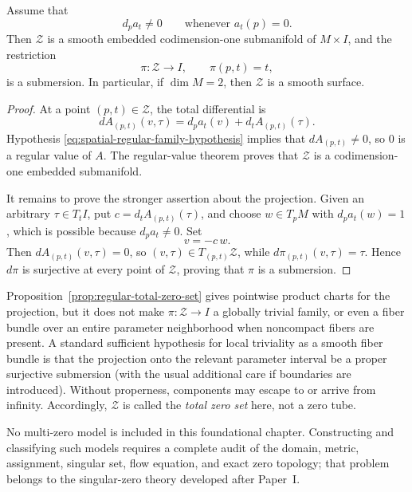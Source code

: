\begin{proposition}\label{prop:regular-total-zero-set}
Assume that
\begin{equation}\label{eq:spatial-regular-family-hypothesis}
 d_pa_t\ne0
 \qquad\text{whenever }a_t(p)=0.
\end{equation}
Then \(\mathcal Z\) is a smooth embedded codimension-one submanifold of
\(M\times I\), and the restriction
\begin{equation}\label{eq:zero-family-projection}
 \pi:\mathcal Z\longrightarrow I,
 \qquad
 \pi(p,t)=t,
\end{equation}
is a submersion.  In particular, if \(\dim M=2\), then
\(\mathcal Z\) is a smooth surface.
\end{proposition}

\begin{proof}
At a point \((p,t)\in\mathcal Z\), the total differential is
\[
 dA_{(p,t)}(v,\tau)
 =d_pa_t(v)+d_tA_{(p,t)}(\tau).
\]
Hypothesis \eqref{eq:spatial-regular-family-hypothesis} implies that
\(dA_{(p,t)}\ne0\), so \(0\) is a regular value of \(A\).  The regular-value
theorem proves that \(\mathcal Z\) is a codimension-one embedded submanifold.

It remains to prove the stronger assertion about the projection.  Given an
arbitrary \(\tau\in T_tI\), put
\(c=d_tA_{(p,t)}(\tau)\), and choose \(w\in T_pM\) with
\(d_pa_t(w)=1\), which is possible because \(d_pa_t\ne0\).  Set
\[
 v=-c\,w.
\]
Then \(dA_{(p,t)}(v,\tau)=0\), so
\((v,\tau)\in T_{(p,t)}\mathcal Z\), while
\(d\pi_{(p,t)}(v,\tau)=\tau\).  Hence \(d\pi\) is surjective at every
point of \(\mathcal Z\), proving that \(\pi\) is a submersion.
\end{proof}

\begin{remark}\label{rem:zero-family-properness}
Proposition~\ref{prop:regular-total-zero-set} gives pointwise product charts
for the projection, but it does not make \(\pi:\mathcal Z\to I\) a globally
trivial family, or even a fiber bundle over an entire parameter neighborhood
when noncompact fibers are present.  A standard sufficient hypothesis for local
triviality as a smooth fiber bundle is that the projection onto the relevant
parameter interval be a proper surjective submersion (with the usual additional
care if boundaries are introduced).  Without properness, components may escape
to or arrive from infinity.  Accordingly, \(\mathcal Z\) is called the
\emph{total zero set} here, not a zero tube.
\end{remark}

No multi-zero model is included in this foundational chapter.  Constructing and
classifying such models requires a complete audit of the domain, metric,
assignment, singular set, flow equation, and exact zero topology; that problem
belongs to the singular-zero theory developed after Paper~I.
